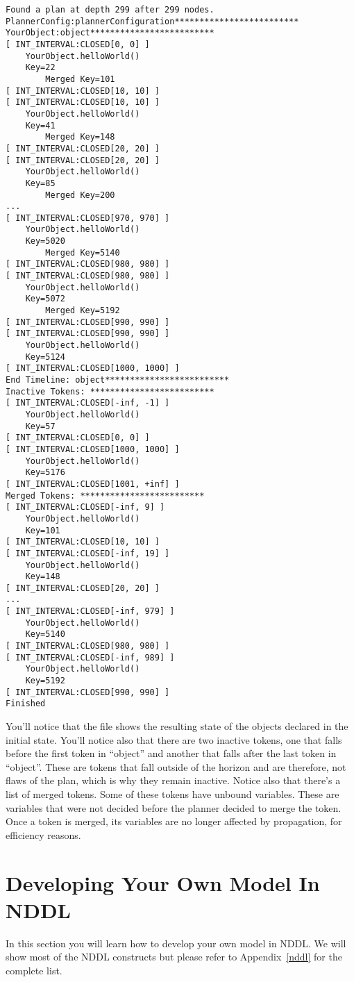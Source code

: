 \documentclass[10pt, letterpaper, twoside]{article}
\begin{document}
\begin{verbatim}
Found a plan at depth 299 after 299 nodes.
PlannerConfig:plannerConfiguration*************************
YourObject:object*************************
[ INT_INTERVAL:CLOSED[0, 0] ]
	YourObject.helloWorld()
	Key=22
		Merged Key=101
[ INT_INTERVAL:CLOSED[10, 10] ]
[ INT_INTERVAL:CLOSED[10, 10] ]
	YourObject.helloWorld()
	Key=41
		Merged Key=148
[ INT_INTERVAL:CLOSED[20, 20] ]
[ INT_INTERVAL:CLOSED[20, 20] ]
	YourObject.helloWorld()
	Key=85
		Merged Key=200
...
[ INT_INTERVAL:CLOSED[970, 970] ]
	YourObject.helloWorld()
	Key=5020
		Merged Key=5140
[ INT_INTERVAL:CLOSED[980, 980] ]
[ INT_INTERVAL:CLOSED[980, 980] ]
	YourObject.helloWorld()
	Key=5072
		Merged Key=5192
[ INT_INTERVAL:CLOSED[990, 990] ]
[ INT_INTERVAL:CLOSED[990, 990] ]
	YourObject.helloWorld()
	Key=5124
[ INT_INTERVAL:CLOSED[1000, 1000] ]
End Timeline: object*************************
Inactive Tokens: *************************
[ INT_INTERVAL:CLOSED[-inf, -1] ]
	YourObject.helloWorld()
	Key=57
[ INT_INTERVAL:CLOSED[0, 0] ]
[ INT_INTERVAL:CLOSED[1000, 1000] ]
	YourObject.helloWorld()
	Key=5176
[ INT_INTERVAL:CLOSED[1001, +inf] ]
Merged Tokens: *************************
[ INT_INTERVAL:CLOSED[-inf, 9] ]
	YourObject.helloWorld()
	Key=101
[ INT_INTERVAL:CLOSED[10, 10] ]
[ INT_INTERVAL:CLOSED[-inf, 19] ]
	YourObject.helloWorld()
	Key=148
[ INT_INTERVAL:CLOSED[20, 20] ]
...
[ INT_INTERVAL:CLOSED[-inf, 979] ]
	YourObject.helloWorld()
	Key=5140
[ INT_INTERVAL:CLOSED[980, 980] ]
[ INT_INTERVAL:CLOSED[-inf, 989] ]
	YourObject.helloWorld()
	Key=5192
[ INT_INTERVAL:CLOSED[990, 990] ]
Finished
\end{verbatim}

You'll notice that the file shows the resulting state of the objects
declared in the initial state.  You'll notice also that there are two
inactive tokens, one that falls before the first token in ``object'' and
another that falls after the last token in ``object''.  These are tokens
that fall outside of the horizon and are therefore, not flaws of the plan,
which is why they remain inactive.  Notice also that there's a list of
merged tokens.  Some of these tokens have unbound variables.  These are
variables that were not decided before the planner decided to merge the
token.  Once a token is merged, its variables are no longer affected by
propagation, for efficiency reasons.

\section{Developing Your Own Model In NDDL}
\label{modeling}
In this section you will learn how to develop your own model in NDDL.  We
will show most of the NDDL constructs but please refer to
Appendix~\ref{nddl} for the complete list.
\end{document}
